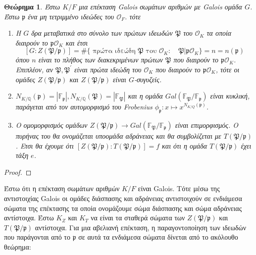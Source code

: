 \documentclass[oneside,a4paper]{article}
\newtheorem{theorem}{Θεώρημα}
\newcommand {\tl}{\textlatin}
\newcommand{\Q}{\mathbb{Q}}
\begin{document}
\begin{theorem} Έστω $K/F$ μια επέκταση \tl{Galois} σωμάτων αριθμών με \tl{Galois} ομάδα $G$. Έστω $\mathfrak{p}$ ένα μη τετριμμένο ιδεώδες του $\mathcal{O}_F$. τότε
	\begin{enumerate}
		\item Η $G$ δρα μεταβατικά στο σύνολο των πρώτων ιδεωδών $\mathfrak{P}$ του $\mathcal{O}_K$ τα οποία διαιρούν το $\mathfrak{p}\mathcal{O}_K$ και έτσι $$[G:Z(\mathfrak{P}/\mathfrak{p})] = \#\{\text{ πρώτα ιδεώδη } \mathfrak{P} \text{ του } \mathcal{O}_K: \quad \mathfrak{P}|\mathfrak{p}\mathcal{O}_K\} = n = n(\mathfrak{p})$$ όπου $n$ είναι το πλήθος των διακεκριμένων πρώτων $\mathfrak{P}$ που διαιρούν το $\mathfrak{p}\mathcal{O}_K$. Επιπλέον, αν $\mathfrak{P},\mathfrak{P}^{\prime}$ είναι πρώτα ιδεώδη του $\mathcal{O}_K$ που διαιρούν το $\mathfrak{p}\mathcal{O}_K$, τότε οι ομάδες $Z(\mathfrak{P}/\mathfrak{p})$ και $Z(\mathfrak{P}/\mathfrak{p})$ είναι $G$-συγυζείς.
		\item $N_{K/\Q}(\mathfrak{p}) = |\mathbb{F}_{\mathfrak{p}}|, N_{K/\Q}(\mathfrak{P}) = |\mathbb{F}_{\mathfrak{P}}|$ και η ομάδα $Gal(\mathbb{F}_{\mathfrak{P}}/ \mathbb{F}_{\mathfrak{p}})$ είναι κυκλική, παράγεται από τον αυτομορφισμό του \tl{Frobenius} $\phi_{\mathfrak{p}} : x \mapsto x^{N_{K/Q}(\mathfrak{p})}$.
		\item Ο ομομορφισμός ομάδων $Z(\mathfrak{P}/\mathfrak{p}) \rightarrow Gal(\mathbb{F}_{\mathfrak{P}}/ \mathbb{F}_{\mathfrak{p}})$ είναι επιμορφισμός. Ο πυρήνας του θα ονομάζεται υποομάδα αδράνειας και θα συμβολίζεται με $T(\mathfrak{P}/\mathfrak{p})$. Ετσι θα έχουμε ότι $[Z(\mathfrak{P}/\mathfrak{p}): T(\mathfrak{P}/\mathfrak{p})] = f$ και ότι η ομάδα $T(\mathfrak{P}/\mathfrak{p})$ έχει τάξη $e$. 
	\end{enumerate}
\end{theorem}

\begin{proof}
\end{proof}

Έστω ότι η επέκταση σωμάτων αριθμών $K/F$ είναι \tl{Galois}. Τότε μέσω της αντιστοιχίας \tl{Galois} οι ομάδες διάσπασης και αδράνειας αντιστοιχούν σε ενδιάμεσα σώματα της επέκτασης τα οποία ονομάζουμε σώμα διάσπασης και σώμα αδράνειας αντίστοιχα. Έστω $K_Z$ και $K_T$ να είναι τα σταθερά σώματα των $Z(\mathfrak{P}/\mathfrak{p})$ και $T(\mathfrak{P}/\mathfrak{p})$ αντίστοιχα. Για μια αβελιανή επέκταση, η παραγοντοποίηση των ιδεωδών που παράγονται από το $\mathfrak{p}$ σε αυτά τα ενδιάμεσα σώματα δίνεται από το ακόλουθο θεώρημα:
\end{document}
